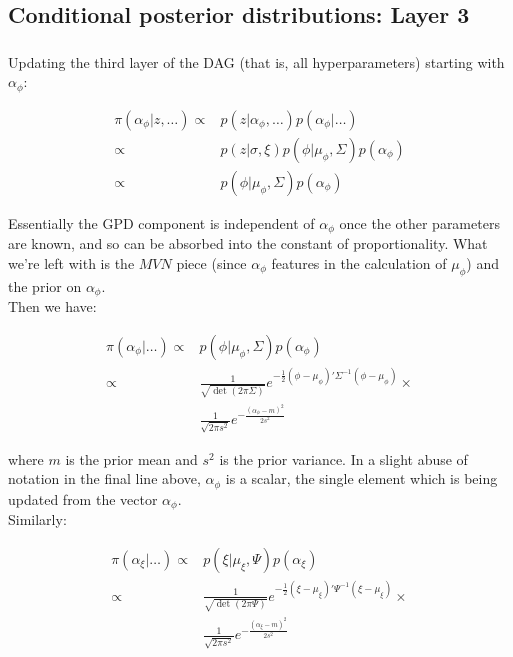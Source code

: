 \documentclass{article}
\begin{document}
\subsection*{Conditional posterior distributions: Layer 3}

\subsubsection*{\pmb{$\alpha$}}

Updating the third layer of the DAG (that is, all hyperparameters) starting with $\alpha_\phi$:

\begin{align*}
\pi(\alpha_\phi | z, \dots ) \propto & p(z | \alpha_\phi, \dots ) p(\alpha_\phi | \dots) \\
\propto & p(z | \sigma, \xi)  p(\phi | \mu_\phi, \Sigma) p(\alpha_\phi) \\
\propto & p(\phi | \mu_\phi, \Sigma) p(\alpha_\phi)
\end{align*}

Essentially the GPD component is independent of $\alpha_\phi$ once the other parameters are known, and so can be absorbed into the constant of proportionality. What we're left with is the $MVN$ piece (since $\alpha_\phi$ features in the calculation of $\mu_\phi$) and the prior on $\alpha_\phi$. \\

Then we have:

\begin{align*}
\pi(\alpha_\phi | \dots ) \propto & p(\phi | \mu_\phi, \Sigma) p(\alpha_\phi) \\
\propto & \frac{1}{\sqrt{\det(2 \pi \Sigma)}} e^{-\frac{1}{2} (\phi - \mu_\phi)' \Sigma^{-1} (\phi - \mu_\phi) } \times \\
& \frac{1}{\sqrt{2 \pi s^2}} e^{-\frac{(\alpha_\phi - m)^2}{2 s^2}}
\end{align*}

where $m$ is the prior mean and $s^2$ is the prior variance. In a slight abuse of notation in the final line above, $\alpha_\phi$ is a scalar, the single element which is being updated from the vector $\alpha_\phi$.
\\

Similarly:

\begin{align*}
\pi(\alpha_\xi | \dots ) \propto & p(\xi | \mu_\xi, \Psi) p(\alpha_\xi) \\
\propto & \frac{1}{\sqrt{\det(2 \pi \Psi)}} e^{-\frac{1}{2} (\xi - \mu_\xi)' \Psi^{-1} (\xi - \mu_\xi) } \times \\
& \frac{1}{\sqrt{2 \pi s^2}} e^{-\frac{(\alpha_\xi - m)^2}{2 s^2}}
\end{align*}
\end{document}
